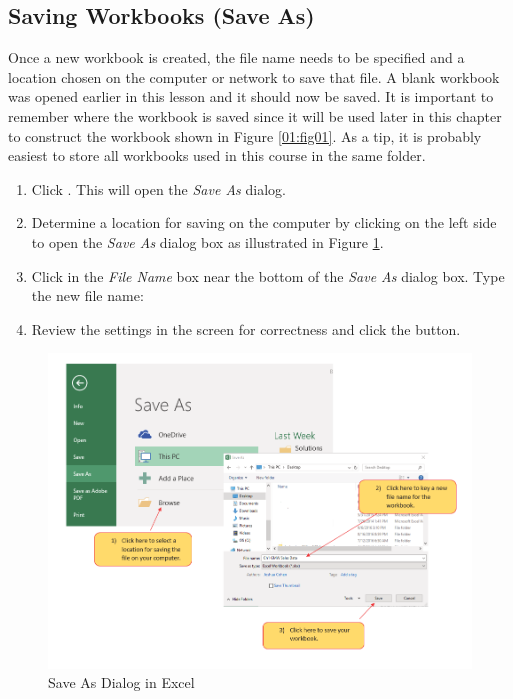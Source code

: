 \subsection{Saving Workbooks (Save As)}

Once a new workbook is created, the file name needs to be specified and a location chosen on the computer or network to save that file. A blank workbook was opened earlier in this lesson and it should now be saved. It is important to remember where the workbook is saved since it will be used later in this chapter to construct the workbook shown in Figure \ref{01:fig01}. As a tip, it is probably easiest to store all workbooks used in this course in the same folder.

\begin{enumerate}[resume]
	\item Click . This will open the \textit{Save As} dialog.
	\item Determine a location for saving on the computer by clicking  on the left side to open the \textit{Save As} dialog box as illustrated in Figure \ref{01:fig12}.
	\item Click in the \textit{File Name} box near the bottom of the \textit{Save As} dialog box. Type the new file name: 
	\item Review the settings in the screen for correctness and click the  button.
\end{enumerate}

\begin{figure}[H]
	\centering
	\includegraphics[width=\maxwidth{.95\linewidth}]{gfx/ch01_fig12}
	\caption{Save As Dialog in Excel}
	\label{01:fig12}
\end{figure}

